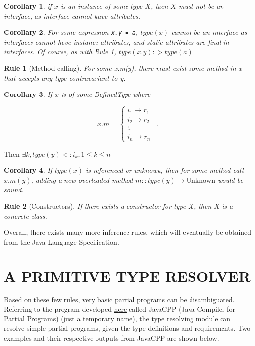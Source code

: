 \documentclass{article}
\newtheorem{inferencerule}{Rule}[section]
\newtheorem{inferencecorollary}{Corollary}[inferencerule]
\begin{document}
\begin{inferencecorollary}
    if $x$ is an instance of some type $X$, then $X$ must not be an interface, as interface
    cannot have attributes.
\end{inferencecorollary}

\begin{inferencecorollary}
    For some expression \texttt{x.y = a}, 
    $type(x)$ cannot be an interface as interfaces cannot have instance attributes,
    and static attributes are final in interfaces. 
    Of course, as with Rule 1, $type(x.y) :> type(a)$
\end{inferencecorollary}

\begin{inferencerule}[Method calling]
    For some x.m(y), there must exist some method in x that accepts any type contravariant to y.
\end{inferencerule}

\begin{inferencecorollary}
    If $x$ is of some DefinedType where
\end{inferencecorollary}

\[
x.m =
\begin{cases}
    i_1 \rightarrow r_1\\
    i_2 \rightarrow r_2\\
    \vdots ,\\
    i_n \rightarrow r_n
\end{cases}
\enspace .
\]

Then $\exists k, type(y) <: i_k, 1 \leq k \leq n$

\begin{inferencecorollary}
    If $type(x)$ is referenced or unknown, then for some method call $x.m(y)$, adding
    a new overloaded method $m::type(y) \rightarrow \textrm{Unknown}$ would be sound.
\end{inferencecorollary}

\begin{inferencerule}[Constructors]
    If there exists a constructor for type $X$, then $X$ is a concrete class.
\end{inferencerule}

Overall, there exists many more inference rules, which will eventually be obtained from
the Java Language Specification.

\section{A PRIMITIVE TYPE RESOLVER}
Based on these few rules, very basic partial programs can be disambiguated.
Referring to the program developed \href{https://github.com/yonggqiii/javacpp.git}{here}
called JavaCPP (Java Compiler for Partial Programs) (just a temporary name),
the type resolving module can resolve simple partial programs, given the type
definitions and requirements. Two examples and their respective outputs from JavaCPP are
shown below.\\
\end{document}
